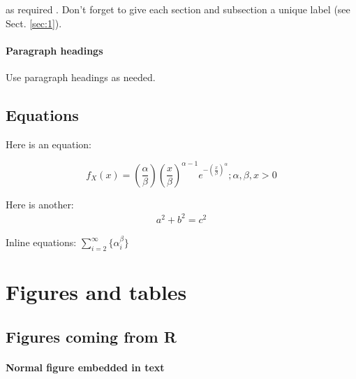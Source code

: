 \documentclass[useAMS,usenatbib,referee]{biom}
\begin{document}
as required \citep{hoerl1970ridge, zou2005regularization}. Don't forget
to give each section and subsection a unique label (see Sect.
\ref{sec:1}).

\hypertarget{paragraph-headings}{%
\paragraph{Paragraph headings}\label{paragraph-headings}}

Use paragraph headings as needed.

\hypertarget{equations}{%
\subsection{Equations}\label{equations}}

Here is an equation:

\[ f_{X}(x) = \left(\frac{\alpha}{\beta}\right)\left(\frac{x}{\beta}\right)^{\alpha-1}e^{-\left(\frac{x}{\beta}\right)^{\alpha}}; \alpha,\beta,x > 0 \]

Here is another: \begin{align}
a^2+b^2=c^2
\end{align}

Inline equations: \(\sum_{i = 2}^\infty\{\alpha_i^\beta\}\)

\hypertarget{figures-and-tables}{%
\section{Figures and tables}\label{figures-and-tables}}

\hypertarget{figures-coming-from-r}{%
\subsection{Figures coming from R}\label{figures-coming-from-r}}

\hypertarget{normal-figure-embedded-in-text}{%
\paragraph{Normal figure embedded in
text}\label{normal-figure-embedded-in-text}}
\end{document}
